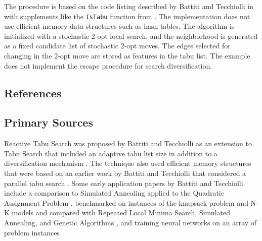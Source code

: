 The procedure is based on the code listing described by Battiti and Tecchiolli in \cite{Battiti1995a} with supplements like the \texttt{IsTabu} function from \cite{Battiti1994}. The implementation does not use efficient memory data structures such as hash tables. The algorithm is initialized with a stochastic 2-opt local search, and the neighborhood is generated as a fixed candidate list of stochastic 2-opt moves. The edges selected for changing in the 2-opt move are stored as features in the tabu list. The example does not implement the escape procedure for search diversification. 



\subsection{References}

% 
% 
\subsection{Primary Sources}
Reactive Tabu Search was proposed by Battiti and Tecchiolli as an extension to Tabu Search that included an adaptive tabu list size in addition to a diversification mechanism \cite{Battiti1994}. The technique also used efficient memory structures that were based on an earlier work by Battiti and Tecchiolli that considered a parallel tabu search \cite{Battiti1992}.
Some early application papers by Battiti and Tecchiolli include a comparison to Simulated Annealing applied to the Quadratic Assignment Problem  \cite{Battiti1994a}, benchmarked on instances of the knapsack problem and N-K models and compared with Repeated Local Minima Search, Simulated Annealing, and Genetic Algorithms \cite{Battiti1995a}, and training neural networks on an array of problem instances \cite{Battiti1995b}.

